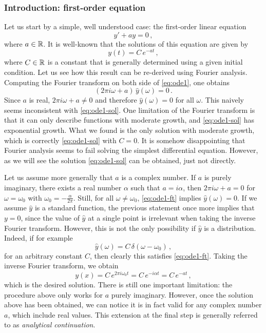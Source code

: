 \subsubsection{Introduction: first-order equation}
Let us start by a simple, well understood case: the first-order linear equation
\begin{equation}
  y'+ay=0\,,\label{eq:ode1}
\end{equation}
where $a\in\mathbb{R}$. It is well-known that the solutions of this equation are given by
\begin{equation}
  y(t)=C\,e^{-at}\,,
  \label{eq:ode1-sol}
\end{equation}
where $C\in\mathbb{R}$ is a constant that is generally determined using a given initial condition.
Let us see how this result can be re-derived using Fourier analysis. Computing the Fourier
transform on both side of \cref{eq:ode1}, one obtains
\begin{equation}
  (2\pi i\omega+a)\,\hat{y}(\omega)=0\,.
  \label{eq:ode1-ft}
\end{equation}
Since $a$ is real, $2\pi i\omega+a\neq 0$ and therefore $\hat{y}(\omega)=0$ for all
$\omega$. This naively seems inconsistent with \cref{eq:ode1-sol}. One limitation of the
Fourier transform is that it can only describe functions with moderate growth, and
\cref{eq:ode1-sol} has exponential growth. What we found is the only solution with
moderate growth, which is correctly \cref{eq:ode1-sol} with $C=0$. It is somehow
disappointing that Fourier analysis seems to fail solving the simplest differential
equation. However, as we will see the solution \cref{eq:ode1-sol} can be obtained, just
not directly.

Let us assume more generally that $a$ is a complex number. If $a$ is purely imaginary, \ie
there exists a real number $\alpha$ such that $a=i\alpha$, then $2\pi i\omega+a=0$ for
$\omega=\omega_0$ with $\omega_0=-\frac{\alpha}{2\pi}$. Still, for all
$\omega\neq\omega_0$, \cref{eq:ode1-ft} implies $\hat{y}(\omega)=0$. If we assume
$\hat{y}$ is a standard function, the previous statement once more implies that $y=0$,
since the value of $\hat{y}$ at a single point is irrelevant when taking the inverse
Fourier transform. However, this is not the only possibility if $\hat{y}$ is a
distribution. Indeed, if for example
\begin{equation}
  \hat{y}(\omega)=C\,\delta(\omega-\omega_0)\,,
  \label{eq:ode1-delta}
\end{equation}
for an arbitrary constant $C$, then clearly this satisfies \cref{eq:ode1-ft}. Taking the
inverse Fourier transform, we obtain
\begin{equation}
  y(x)=C\,e^{2\pi i\omega_0t}=C\,e^{-i\alpha t}=C\,e^{-at}\,,
\end{equation}
which is the desired solution. There is still one important limitation: the procedure
above only works for $a$ purely imaginary. However, once the solution above has been
obtained, we can notice it is in fact valid for any complex number $a$, which include real
values. This extension at the final step is generally referred to as \emph{analytical
continuation}.

